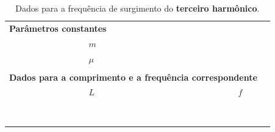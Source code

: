\begin{table}[!htb]
\forceversofloat
\caption{Dados para a frequência de surgimento do \textbf{terceiro harmônico}.}
\label{Tab:FrequenciaFuncaoComprimento3}
	\begin{center}
		\begin{tabular}{cp{45mm}p{45mm}c}
		\toprule
\multicolumn{2}{l}{\textbf{Parâmetros constantes}}&\\
		\cmidrule{2-3}
		& \cellcolor[gray]{0.89}$m$ &\cellcolor[gray]{0.92} \\
		& \cellcolor[gray]{0.95}$\mu$ & \cellcolor[gray]{0.97}\\
		\cmidrule{2-3}
		\\
\multicolumn{3}{l}{\textbf{Dados para a comprimento e a frequência correspondente}} \\
		\cmidrule{2-3}		
		& $L$ & $f$ &\\
		\cmidrule{2-3}
		& \cellcolor[gray]{0.89} & \cellcolor[gray]{0.92} \\
		& \cellcolor[gray]{0.95} & \cellcolor[gray]{0.97} \\
		& \cellcolor[gray]{0.89} & \cellcolor[gray]{0.92} \\
		& \cellcolor[gray]{0.95} & \cellcolor[gray]{0.97} \\
		& \cellcolor[gray]{0.89} & \cellcolor[gray]{0.92} \\
		& \cellcolor[gray]{0.95} & \cellcolor[gray]{0.97} \\
		& \cellcolor[gray]{0.89} & \cellcolor[gray]{0.92} \\
		& \cellcolor[gray]{0.95} & \cellcolor[gray]{0.97} \\
		\cmidrule{2-3}
		\bottomrule
		\end{tabular}
	\end{center}
\end{table}

